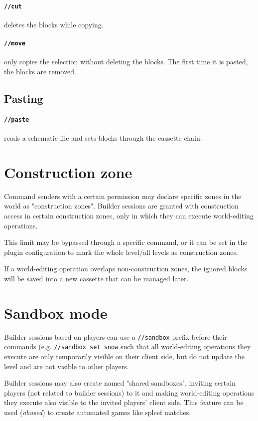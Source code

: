 \documentclass{report}
\begin{document}
				\paragraph{\texttt{//cut}} deletes the blocks while copying.
				\paragraph{\texttt{//move}} only copies the selection without deleting the blocks. The first time it is
				pasted, the blocks are removed.
			\subsection{Pasting}
				\paragraph{\texttt{//paste}} reads a schematic file and sets blocks through the cassette chain.

		\section{Construction zone}
			Command senders with a certain permission may declare specific zones in the world as "construction zones".
			Builder sessions are granted with construction access in certain construction zones, only in which they can
			execute world-editing operations.

			This limit may be bypassed through a specific command, or it can be set in the plugin configuration to mark
			the whole level/all levels as construction zones.

			If a world-editing operation overlaps non-construction zones, the ignored blocks will be saved into a new
			cassette that can be managed later.

		\section{Sandbox mode}
			Builder sessions based on players can use a \texttt{//sandbox} prefix before their commands (e.g.
			\texttt{//sandbox set snow} such that all world-editing operations they execute are only temporarily visible
			on their client side, but do not update the level and are not visible to other players.

			Builder sessions may also create named "shared sandboxes", inviting certain players (not related to builder
			sessions) to it and making world-editing operations they execute also visible to the invited players' client
			side. This feature can be used (\emph{abused}) to create automated games like spleef matches.
\end{document}

